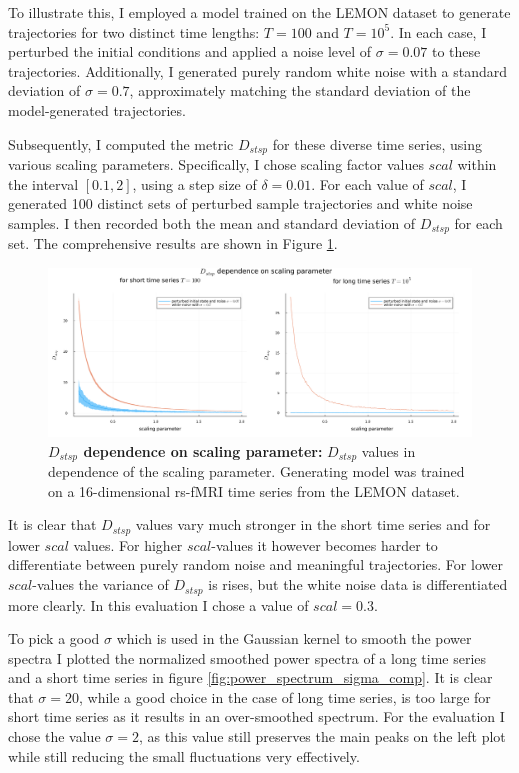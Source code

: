 To illustrate this, I employed a model trained on the LEMON dataset to generate trajectories for two distinct time lengths: $T=100$ and $T=10^5$. In each case,
I perturbed the initial conditions and applied a noise level of $\sigma=0.07$ to these trajectories. Additionally,
I generated purely random white noise with a standard deviation of $\sigma=0.7$,
approximately matching the standard deviation of the model-generated trajectories.

Subsequently, I computed the metric $D_{stsp}$ for these diverse time series, using various scaling parameters. Specifically, 
I chose scaling factor values $scal$ within the interval $[0.1, 2]$, using a step size of $\delta = 0.01$. 
For each value of $scal$, I generated 100 distinct sets of perturbed sample trajectories and white noise samples. 
I then recorded both the mean and standard deviation of $D_{stsp}$ for each set. The comprehensive results are shown in Figure \ref{fig:dstsp_comp}.

\begin{figure}
    \includegraphics[width=\textwidth]{Images/dstsp_comp.png}
    \caption[$D_{stsp}$ dependence on scaling parameter]{\textbf{$D_{stsp}$ dependence on scaling parameter: } $D_{stsp}$ values in dependence of the scaling 
    parameter. Generating model was trained on a 16-dimensional rs-fMRI time series from the LEMON dataset.}
    \label{fig:dstsp_comp}
\end{figure}

It is clear that $D_{stsp}$ values vary much stronger in the short time series and for lower $scal$ values. For higher $scal$-values it however becomes harder to differentiate 
between purely random noise and meaningful trajectories. For lower $scal$-values the variance of $D_{stsp}$ is rises, but the white noise data is differentiated more clearly. 
In this evaluation I chose a value of $scal=0.3$.

To pick a good $\sigma$ which is used in the Gaussian kernel to smooth the power spectra I plotted the normalized smoothed power spectra of a long time series and a short
time series in figure \ref{fig:power_spectrum_sigma_comp}. It is clear that $\sigma=20$, while a good choice in the case of long time series,
is too large for short time series as it results in an over-smoothed spectrum. For the evaluation I chose the value $\sigma=2$, as this value still preserves 
the main peaks on the left plot while still reducing the small fluctuations very effectively.

